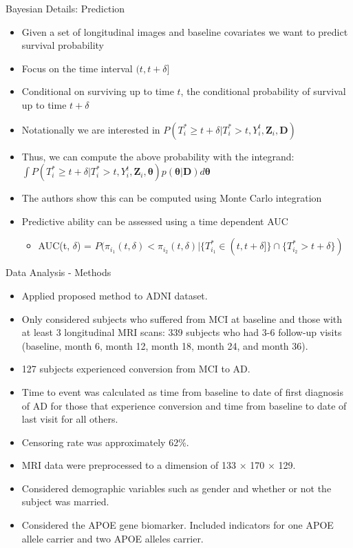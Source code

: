 \documentclass[
  ignorenonframetext,
]{beamer}
\providecommand{\tightlist}{%
  \setlength{\itemsep}{0pt}\setlength{\parskip}{0pt}}
\begin{document}
\begin{frame}{Bayesian Details: Prediction}
\protect\hypertarget{bayesian-details-prediction}{}
\begin{itemize}
\tightlist
\item
  Given a set of longitudinal images and baseline covariates we want to
  predict survival probability
\item
  Focus on the time interval \((t, t + \delta]\)
\item
  Conditional on surviving up to time \(t\), the conditional probability
  of survival up to time \(t +\delta\)
\item
  Notationally we are interested in
  \(P(T_i^* \geq t + \delta | T_i^* > t, Y_i^t, \boldsymbol{Z}_i, \boldsymbol{D})\)
\item
  Thus, we can compute the above probability with the integrand:
  \(\int P(T_i^* \geq t + \delta | T_i^* > t, Y_i^t, \boldsymbol{Z}_i, \boldsymbol{\theta})p(\boldsymbol{\theta}|\boldsymbol{D})d\boldsymbol{\theta}\)
\item
  The authors show this can be computed using Monte Carlo integration
\item
  Predictive ability can be assessed using a time dependent AUC

  \begin{itemize}
  \tightlist
  \item
    AUC(t, \(\delta\)) =
    \(P(\pi_{i_1}(t, \delta) < \pi_{i_2}(t, \delta) | \lbrace T^*_{i_1} \in (t, t + \delta] \rbrace \cap \lbrace T^*_{i_2} > t+ \delta \rbrace)\)
  \end{itemize}
\end{itemize}
\end{frame}

\begin{frame}{Data Analysis - Methods}
\protect\hypertarget{data-analysis---methods}{}
\begin{itemize}
\item
  Applied proposed method to ADNI dataset.
\item
  Only considered subjects who suffered from MCI at baseline and those
  with at least 3 longitudinal MRI scans: 339 subjects who had 3-6
  follow-up visits (baseline, month 6, month 12, month 18, month 24, and
  month 36).
\item
  127 subjects experienced conversion from MCI to AD.
\item
  Time to event was calculated as time from baseline to date of first
  diagnosis of AD for those that experience conversion and time from
  baseline to date of last visit for all others.
\item
  Censoring rate was approximately 62\%.
\item
  MRI data were preprocessed to a dimension of 133 × 170 × 129.
\item
  Considered demographic variables such as gender and whether or not the
  subject was married.
\item
  Considered the APOE gene biomarker. Included indicators for one APOE
  allele carrier and two APOE alleles carrier.
\end{itemize}
\end{frame}
\end{document}
